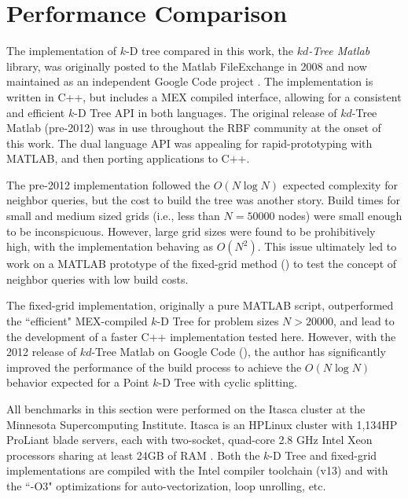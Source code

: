 \documentclass{report}
\begin{document}
\section{Performance Comparison}

The implementation of $k$-D tree compared in this work, the \emph{$kd$-Tree Matlab} library, was originally posted to the Matlab FileExchange in 2008 \cite{TagliasacchiMFE} and now maintained as an independent Google Code project \cite{TagliasacchiGC}. The implementation is written in C++, but includes a MEX compiled interface, allowing for a consistent and efficient $k$-D Tree API in both languages. 
The original release of $kd$-Tree Matlab (pre-2012) was in use throughout the RBF community at the onset of this work. The dual language API was appealing for rapid-prototyping with MATLAB, and then porting applications to C++. 

The pre-2012 implementation followed the $O(N \log N)$ expected complexity for neighbor queries, but the cost to build the tree was another story. Build times for small and medium sized grids (i.e., less than $N=50000$ nodes) were small enough to be inconspicuous. However, large grid sizes were found to be prohibitively high, with the implementation behaving as $O(N^2)$. This issue ultimately led to work on a MATLAB prototype of the fixed-grid method (\cite{BolligRBFFixedGrid}) to test the concept of neighbor queries with low build costs. 

The fixed-grid implementation, originally a pure MATLAB script, outperformed the ``efficient" MEX-compiled $k$-D Tree for problem sizes $N > 20000$, and lead to the development of a faster C++ implementation tested here. However, with the 2012 release of $kd$-Tree Matlab on Google Code (\cite{TagliasacchiGC}), the author has significantly improved the performance of the build process to achieve the $O(N \log N)$ behavior expected for a Point $k$-D Tree with cyclic splitting. 

All benchmarks in this section were performed on the Itasca cluster at the Minnesota Supercomputing Institute. Itasca is an HPLinux cluster with 1,134HP ProLiant blade servers, each with two-socket, quad-core 2.8 GHz Intel Xeon processors sharing at least 24GB of RAM \cite{MSIItasca}. Both the $k$-D Tree and fixed-grid implementations are compiled with the Intel compiler toolchain (v13) and with the ``-O3" optimizations for auto-vectorization, loop unrolling, etc. 
\end{document}
